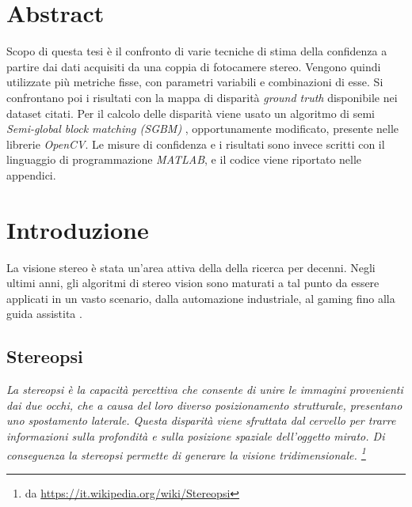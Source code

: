 \documentclass[12pt]{report}
\newcommand{\nullpage}{\newpage\null\thispagestyle{empty}}  %
\begin{document}
	\chapter*{Abstract}
	\label{sec:Abstract}
	\pagestyle{fancy}
	
	Scopo di questa tesi è il confronto di varie tecniche di stima della confidenza a partire dai dati acquisiti da una coppia di fotocamere stereo. Vengono quindi utilizzate più metriche fisse, con parametri variabili e combinazioni di esse. Si confrontano poi i risultati con la mappa di disparità \textit{ground truth} disponibile nei dataset citati. Per il calcolo delle disparità viene usato un algoritmo di semi \textit{Semi-global block matching (SGBM)} , opportunamente modificato, presente nelle librerie \textit{OpenCV}. Le misure di confidenza e i risultati sono invece scritti con il linguaggio di programmazione \textit{MATLAB}, e il codice viene riportato nelle appendici.
	

	\nullpage						%
	\tableofcontents				%
	\nullpage						%

	\renewcommand{\thepage}{\arabic{page}} %
	\setcounter{page}{1}                   %


	\chapter{Introduzione}
	\label{sec:introduzione}
	\pagestyle{fancy}
	
		La visione stereo è stata un'area attiva della della ricerca per decenni. Negli ultimi anni, gli algoritmi di stereo vision sono maturati a tal punto da essere applicati in un vasto scenario, dalla automazione industriale, al gaming fino alla guida assistita \cite{mercedes}.
	
		\section{Stereopsi}
		\label{sec:Stereopsi}
			\textit{
			La stereopsi è la capacità percettiva che consente di unire le immagini provenienti dai due occhi, che a causa del loro diverso posizionamento strutturale, presentano uno spostamento laterale. Questa disparità viene sfruttata dal cervello per trarre informazioni sulla profondità e sulla posizione spaziale dell'oggetto mirato. Di conseguenza la stereopsi permette di generare la visione tridimensionale. \footnote{da \url{https://it.wikipedia.org/wiki/Stereopsi}} \newline}
			
\end{document}
